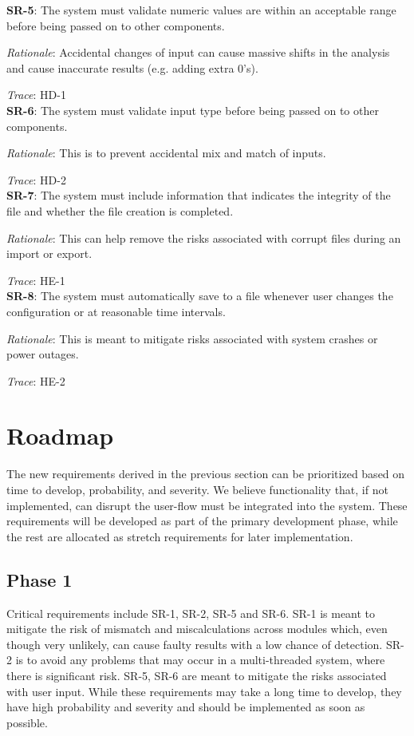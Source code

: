 \documentclass{article}
\begin{document}
\textbf{SR-5}:
The system must validate numeric values are within an acceptable range before being passed on to other components.

\emph{Rationale}: Accidental changes of input can cause massive shifts in the analysis and cause inaccurate results 
(e.g. adding extra 0’s).

\emph{Trace}: HD-1 \\

\textbf{SR-6}:
The system must validate input type before being passed on to other components.

\emph{Rationale}: This is to prevent accidental mix and match of inputs.

\emph{Trace}: HD-2\\

\textbf{SR-7}:
The system must include information that indicates the integrity of the file and whether the file creation is completed.

\emph{Rationale}: This can help remove the risks associated with corrupt files during an import or export. 

\emph{Trace}: HE-1\\

\textbf{SR-8}:
The system must automatically save to a file whenever user changes the configuration or at reasonable time intervals.

\emph{Rationale}: This is meant to mitigate risks associated with system crashes or power outages.

\emph{Trace}: HE-2\\

\section{Roadmap}

The new requirements derived in the previous section can be prioritized based on time to develop, probability, and 
severity. We believe functionality that, if not implemented, can disrupt the user-flow must be integrated into the 
system. These requirements will be developed as part of the primary development phase, while the rest are allocated as 
stretch requirements for later implementation. 

\subsection{Phase 1}
Critical requirements include SR-1, SR-2, SR-5 and SR-6. SR-1 is meant to mitigate the risk of mismatch and 
miscalculations across modules which, even though very unlikely, can cause faulty results with a low chance of 
detection. SR-2 is to avoid any problems that may occur in a multi-threaded system, where there is significant risk.
SR-5, SR-6 are meant to mitigate the risks associated with user input. While these requirements may 
take a long time to develop, they have high probability and severity and should be implemented as soon as possible.
\end{document}
